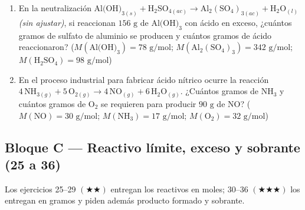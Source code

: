 \documentclass[12pt, letterpaper]{article}
\begin{document}
\begin{enumerate}[leftmargin=*, start=13]
  \item \dificil{}\hspace{0.55em}En la neutralización $\text{Al(OH)}_{3(s)} + \text{H}_2\text{SO}_{4(ac)} \longrightarrow \text{Al}_2(\text{SO}_4)_{3(ac)} + \text{H}_2\text{O}_{(l)}$ \emph{(sin ajustar)}, si reaccionan $156\text{ g}$ de $\text{Al(OH)}_3$ con ácido en exceso, ¿cuántos gramos de sulfato de aluminio se producen y cuántos gramos de ácido reaccionaron? ($M(\text{Al(OH)}_3) = 78\text{ g/mol}$; $M(\text{Al}_2(\text{SO}_4)_3) = 342\text{ g/mol}$; $M(\text{H}_2\text{SO}_4) = 98\text{ g/mol}$)

  \item \dificil{}\hspace{0.55em}En el proceso industrial para fabricar ácido nítrico ocurre la reacción $4\,\text{NH}_{3(g)} + 5\,\text{O}_{2(g)} \longrightarrow 4\,\text{NO}_{(g)} + 6\,\text{H}_2\text{O}_{(g)}$. ¿Cuántos gramos de $\text{NH}_3$ y cuántos gramos de $\text{O}_2$ se requieren para producir $90\text{ g}$ de $\text{NO}$? ($M(\text{NO}) = 30\text{ g/mol}$; $M(\text{NH}_3) = 17\text{ g/mol}$; $M(\text{O}_2) = 32\text{ g/mol}$)

\end{enumerate}

\subsection{Bloque C — Reactivo límite, exceso y sobrante (25 a 36)}

\noindent Los ejercicios 25--29 $(\bigstar\bigstar)$ entregan los reactivos en moles; 30--36 $(\bigstar\bigstar\bigstar)$ los entregan en gramos y piden además producto formado y sobrante.
\end{document}
